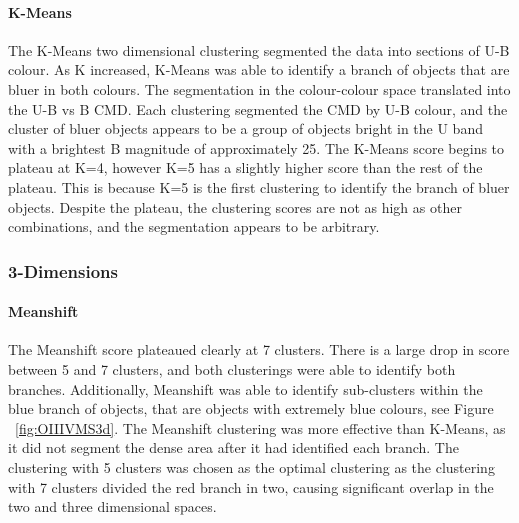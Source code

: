 \paragraph{K-Means}
The K-Means two dimensional clustering segmented the data into sections of U-B colour.
As K increased, K-Means was able to identify a branch of objects that are bluer in both colours.
The segmentation in the colour-colour space translated into the U-B vs B CMD. 
Each clustering segmented the CMD by U-B colour, and the cluster of bluer objects appears to be a group of objects bright in the U band with a brightest B magnitude of approximately 25.
The K-Means score begins to plateau at K=4, however K=5 has a slightly higher score than the rest of the plateau.
This is because K=5 is the first clustering to identify the branch of bluer objects.
Despite the plateau, the clustering scores are not as high as other combinations, and the segmentation appears to be arbitrary. 

\subsubsection{3-Dimensions}

\paragraph{Meanshift}
The Meanshift score plateaued clearly at 7 clusters. There is a large drop in score between 5 and 7 clusters, and both clusterings were able to identify both branches.
Additionally, Meanshift was able to identify sub-clusters within the blue branch of objects, that are objects with extremely blue colours, see Figure ~\ref{fig:OIIIVMS3d}.
The Meanshift clustering was more effective than K-Means, as it did not segment the dense area after it had identified each branch.
The clustering with 5 clusters was chosen as the optimal clustering as the clustering with 7 clusters divided the red branch in two, causing significant overlap in the two and three dimensional spaces.

